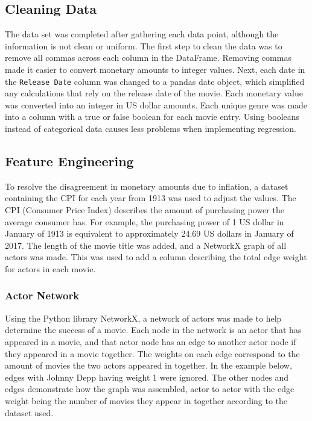 \documentclass[11pt]{article}
\begin{document}
\hypertarget{cleaning-data}{%
	\subsection{Cleaning Data}\label{cleaning-data}}

The data set was completed after gathering each data point, although the
information is not clean or uniform. The first step to clean the data
was to remove all commas across each column in the DataFrame.
Removing commas made it easier to convert monetary amounts to integer values.
Next, each date in the \texttt{Release Date} column was changed to a pandas date
object, which simplified any calculations that rely on the release
date of the movie. Each monetary value was converted into an integer in US dollar amounts. Each unique genre was made into a column
with a true or false boolean for each movie entry. Using booleans instead of categorical data causes less problems when implementing regression.

\hypertarget{feature-engineering}{%
	\subsection{Feature Engineering}\label{feature-engineering}}

To resolve the disagreement in monetary amounts due to
inflation, a dataset containing the CPI for each year from 1913 was
used to adjust the values. The CPI (Consumer Price Index)
describes the amount of purchasing power the average consumer has. For example, the purchasing power of 1 US dollar in January of 1913 is equivalent to approximately 24.69 US dollars in January of 2017. The
length of the movie title was added, and a NetworkX graph of all
actors was made. This was used to add a column describing the total edge weight for actors in each movie.
\hypertarget{actor-network}{%
	\subsubsection{Actor Network}\label{actor-network}}

Using the Python library NetworkX, a network of actors was made to help determine the success of a
movie. Each node in the network is an actor that has appeared in a
movie, and that actor node has an edge to another actor node if
they appeared in a movie together. The weights on each edge
correspond to the amount of movies the two actors appeared in together. In the example below, edges with Johnny Depp having weight 1 were ignored. The other nodes and edges demonstrate how the graph was assembled, actor to actor with the edge weight being the number of movies they appear in together according to the dataset used.
\end{document}
